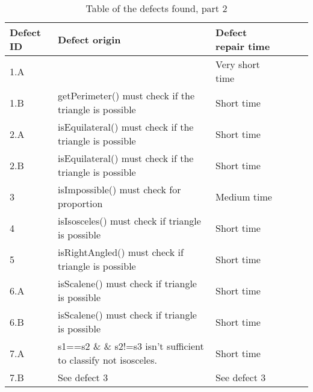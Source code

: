 \begin{table}[!htb]
\caption{Table of the defects found, part 2}
\begin{tabular}{|l|l|l|l|l|l|}
\hline  Defect ID & Defect origin  & Defect repair time \\ \hline
1.A       & ~																													 	 		& Very short time\\
1.B       & getPerimeter() must check if the triangle is possible 			 		& Short time         \\         
2.A       & isEquilateral() must check if the triangle is possible       		& Short time         \\    
2.B       & isEquilateral() must check if the triangle is possible       		& Short time         \\    
3         & isImpossible() must check for proportion                     		& Medium time        \\    
4         & isIsosceles() must check if triangle is possible             		& Short time         \\    
5         & isRightAngled() must check if triangle is possible           		& Short time         \\    
6.A       & isScalene() must check if triangle is possible               		& Short time         \\    
6.B       & isScalene() must check if triangle is possible               		& Short time         \\    
7.A       & s1==s2 \& \& s2!=s3 isn't sufficient to classify not isosceles. & Short time         \\ 
7.B       & See defect 3                                                 		& See defect 3       \\         \hline     
\end{tabular}
\end{table}